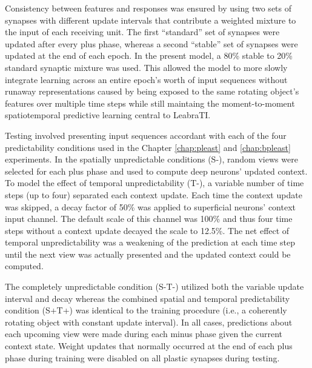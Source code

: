 \documentclass[dwyatte_dissertation.tex]{subfiles}
\begin{document}
Consistency between features and responses was ensured by using two sets of synapses with different update intervals that contribute a weighted mixture to the input of each receiving unit. The first ``standard'' set of synapses were updated after every plus phase, whereas a second ``stable'' set of synapses were updated at the end of each epoch. In the present model, a 80\% stable to 20\% standard synaptic mixture was used. This allowed the model to more slowly integrate learning across an entire epoch's worth of input sequences without runaway representations caused by being exposed to the same rotating object's features over multiple time steps while still maintaing the moment-to-moment spatiotemporal predictive learning central to LeabraTI.

Testing involved presenting input sequences accordant with each of the four predictability conditions used in the Chapter \ref{chap:pleast} and \ref{chap:bpleast} experiments. In the spatially unpredictable conditions (S-), random views were selected for each plus phase and used to compute deep neurons' updated context. To model the effect of temporal unpredictability (T-), a variable number of time steps (up to four) separated each context update. Each time the context update was skipped, a decay factor of 50\% was applied to superficial neurons' context input channel. The default scale of this channel was 100\% and thus four time steps without a context update decayed the scale to 12.5\%. The net effect of temporal unpredictability was a weakening of the prediction at each time step until the next view was actually presented and the updated context could be computed.

The completely unpredictable condition (S-T-) utilized both the variable update interval and decay whereas the combined spatial and temporal predictability condition (S+T+) was identical to the training procedure (i.e., a coherently rotating object with constant update interval). In all cases, predictions about each upcoming view were made during each minus phase given the current context state. Weight updates that normally occurred at the end of each plus phase during training were disabled on all plastic synapses during testing.
\end{document}
